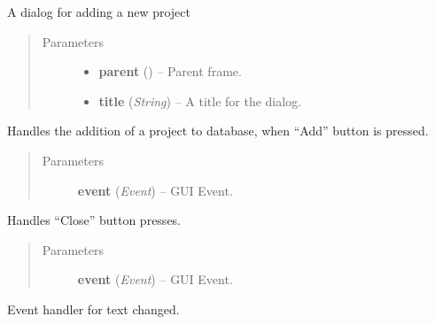 \documentclass[letterpaper,10pt,english]{sphinxmanual}
\begin{document}
\begin{fulllineitems}
\label{dialogs:dialogs.AddProjectDialog}
A dialog for adding a new project
\begin{quote}\begin{description}
\item[{Parameters}] \leavevmode\begin{itemize}
\item {} 
\textbf{parent} () -- Parent frame.

\item {} 
\textbf{title} (\emph{String}) -- A title for the dialog.

\end{itemize}

\end{description}\end{quote}

\begin{fulllineitems}
\label{dialogs:dialogs.AddProjectDialog.OnAdd}
Handles the addition of a project to database, when ``Add'' button
is pressed.
\begin{quote}\begin{description}
\item[{Parameters}] \leavevmode
\textbf{event} (\emph{Event}) -- GUI Event.

\end{description}\end{quote}

\end{fulllineitems}


\begin{fulllineitems}
\label{dialogs:dialogs.AddProjectDialog.OnClose}
Handles ``Close'' button presses.
\begin{quote}\begin{description}
\item[{Parameters}] \leavevmode
\textbf{event} (\emph{Event}) -- GUI Event.

\end{description}\end{quote}

\end{fulllineitems}


\begin{fulllineitems}
\label{dialogs:dialogs.AddProjectDialog.OnText}
Event handler for text changed.

\end{fulllineitems}


\end{fulllineitems}
\end{document}
